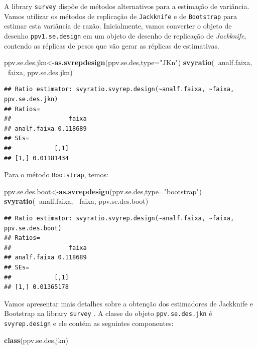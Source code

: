 \documentclass[]{book}
\newenvironment{Shaded}{\begin{snugshade}}{\end{snugshade}}
\newcommand{\KeywordTok}[1]{\textcolor[rgb]{0.13,0.29,0.53}{\textbf{#1}}}
\newcommand{\DataTypeTok}[1]{\textcolor[rgb]{0.13,0.29,0.53}{#1}}
\newcommand{\StringTok}[1]{\textcolor[rgb]{0.31,0.60,0.02}{#1}}
\newcommand{\OperatorTok}[1]{\textcolor[rgb]{0.81,0.36,0.00}{\textbf{#1}}}
\newcommand{\NormalTok}[1]{#1}
\theoremstyle{definition}
\theoremstyle{definition}
\theoremstyle{definition}
\theoremstyle{remark}
\begin{document}
A library \texttt{survey} dispõe de métodos alternativos para a
estimação de variância. Vamos utilizar os métodos de replicação de
\texttt{Jackknife} e de \texttt{Bootstrap} para estimar esta variância
de razão. Inicialmente, vamos converter o objeto de desenho
\texttt{ppv1.se.design} em um objeto de desenho de replicação de
\emph{Jackknife}, contendo as réplicas de pesos que vão gerar as
réplicas de estimativas.

\begin{Shaded}
\begin{Highlighting}[]
\NormalTok{ppv.se.des.jkn<-}\KeywordTok{as.svrepdesign}\NormalTok{(ppv.se.des,}\DataTypeTok{type=}\StringTok{"JKn"}\NormalTok{)}
\KeywordTok{svyratio}\NormalTok{(}\OperatorTok{~}\NormalTok{analf.faixa, }\OperatorTok{~}\NormalTok{faixa, ppv.se.des.jkn)}
\end{Highlighting}
\end{Shaded}

\begin{verbatim}
## Ratio estimator: svyratio.svyrep.design(~analf.faixa, ~faixa, ppv.se.des.jkn)
## Ratios=
##                faixa
## analf.faixa 0.118689
## SEs=
##            [,1]
## [1,] 0.01181434
\end{verbatim}

Para o método \texttt{Bootstrap}, temos:

\begin{Shaded}
\begin{Highlighting}[]
\NormalTok{ppv.se.des.boot<-}\KeywordTok{as.svrepdesign}\NormalTok{(ppv.se.des,}\DataTypeTok{type=}\StringTok{"bootstrap"}\NormalTok{)}
\KeywordTok{svyratio}\NormalTok{(}\OperatorTok{~}\NormalTok{analf.faixa, }\OperatorTok{~}\NormalTok{faixa, ppv.se.des.boot)}
\end{Highlighting}
\end{Shaded}

\begin{verbatim}
## Ratio estimator: svyratio.svyrep.design(~analf.faixa, ~faixa, ppv.se.des.boot)
## Ratios=
##                faixa
## analf.faixa 0.118689
## SEs=
##            [,1]
## [1,] 0.01365178
\end{verbatim}

Vamos apresentar mais detalhes sobre a obtenção dos estimadores de
Jackknife e Bootstrap na library \texttt{survey} \citep{R-survey}. A
classe do objeto \texttt{ppv.se.des.jkn} é \texttt{svyrep.design} e ele
contém as seguintes componentes:

\begin{Shaded}
\begin{Highlighting}[]
\KeywordTok{class}\NormalTok{(ppv.se.des.jkn)}
\end{Highlighting}
\end{Shaded}
\end{document}
